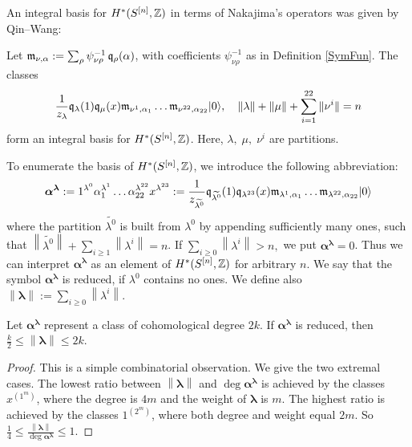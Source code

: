 An integral basis for $H^\ast(S^{[n]},\mathbb{Z})$ in terms of Nakajima's operators was given by Qin--Wang:
\begin{theorem} \label{QinWangTheorem}\cite[Thm. 5.4.]{QinWang} Let $\mathfrak{m}_{\nu,\alpha} := \sum_\rho \psi_{\nu\rho}^{-1}\,\mathfrak{q}_{\rho}(\alpha)$, with coefficients $ \psi_{\nu\rho}^{-1}$ as in Definition \ref{SymFun}. The classes
$$ \frac{1}{z_\lambda} \mathfrak{q}_\lambda(1)\mathfrak{q}_\mu(x)\mathfrak{m}_{\nu^1,\alpha_1}\ldots\mathfrak{m}_{\nu^{22},\alpha_{22}}|0\rangle,\quad \|\lambda\| +\|\mu\| + \sum_{i=1}^{22}\|\nu^i\| = n
$$ 
form an integral basis for $H^\ast(S^{[n]},\mathbb{Z})$. Here,
$\lambda,\; \mu,\; \nu^i$ are partitions.
\end{theorem}
\begin{notation}\label{notation}
To enumerate the basis of $H^\ast(S^{[n]},\mathbb{Z})$, we introduce the following abbreviation:
$$ \boldsymbol\alpha^{\boldsymbol\lambda} :=
1^{\lambda^0} \alpha_1^{\lambda^1}\ldots\alpha_{22}^{\lambda^{22}}x^{\lambda^{23}} :=
\frac{1}{z_{\widetilde{\lambda^0}} }
\mathfrak{q}_{\widetilde{\lambda^0}}(1)\mathfrak{q}_{\lambda^{23}}(x)\mathfrak{m}_{\lambda^1,\alpha_1}\ldots\mathfrak{m}_{\lambda^{22},\alpha_{22}}|0\rangle
$$
where the partition $\widetilde{\lambda^0}$ is built from $\lambda^0$ by appending sufficiently many ones, such that $\left\|\widetilde{\lambda^0}\right\| +\sum_{i\geq 1}\left\|\lambda^i\right\| = n $. If $\sum_{i\geq 0}\left\|\lambda^i\right\| > n, $ we put $\boldsymbol\alpha^{\boldsymbol\lambda}=0$. Thus we can interpret $\boldsymbol\alpha^{\boldsymbol\lambda}$ as an element of $H^\ast(S^{[n]},\mathbb{Z})$ for arbitrary $n$. We say that the symbol $\boldsymbol\alpha^{\boldsymbol\lambda}$ is reduced, if $\lambda^0$ contains no ones. We define also $\left\|\boldsymbol\lambda\right\| := \sum_{i\geq 0}\left\|\lambda^i\right\|$. 
\end{notation}
\begin{lemma}\label{degBound}
Let $\boldsymbol\alpha^{\boldsymbol\lambda}$ represent a class of cohomological degree $2k$. If $\boldsymbol\alpha^{\boldsymbol\lambda}$ is reduced, then $\frac{k}{2}\leq\left\|\boldsymbol{\lambda}\right\| \leq 2k$.
\begin{proof} This is a simple combinatorial observation. We give the two extremal cases.
The lowest ratio between $\left\|\boldsymbol{\lambda}\right\|$ and $\deg \boldsymbol\alpha^{\boldsymbol\lambda}$ is achieved by the classes $x^{(1^m)}$, where the degree is $4m$ and the weight of $\boldsymbol{\lambda}$ is $m$. The highest ratio is achieved by the classes $1^{(2^m)}$, where both degree and weight equal $2m$. So $\frac{1}{4}\leq\frac{\left\|\boldsymbol{\lambda}\right\|}{\deg \boldsymbol\alpha^{\boldsymbol\lambda}}\leq 1$.
\end{proof}
\end{lemma}

